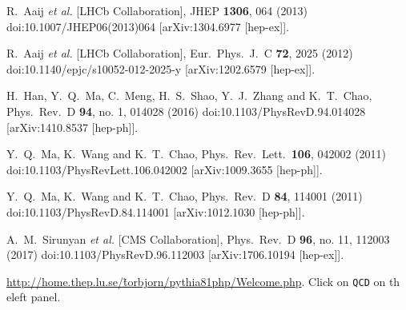 \documentclass[12pt]{article}
\begin{document}
\begin{thebibliography}{1}
  R.~Aaij {\it et al.} [LHCb Collaboration],
  JHEP {\bf 1306}, 064 (2013)
  doi:10.1007/JHEP06(2013)064
  [arXiv:1304.6977 [hep-ex]].

  R.~Aaij {\it et al.} [LHCb Collaboration],
  Eur.\ Phys.\ J.\ C {\bf 72}, 2025 (2012)
  doi:10.1140/epjc/s10052-012-2025-y
  [arXiv:1202.6579 [hep-ex]].

  H.~Han, Y.~Q.~Ma, C.~Meng, H.~S.~Shao, Y.~J.~Zhang and K.~T.~Chao,
  Phys.\ Rev.\ D {\bf 94}, no. 1, 014028 (2016)
  doi:10.1103/PhysRevD.94.014028
  [arXiv:1410.8537 [hep-ph]].

  Y.~Q.~Ma, K.~Wang and K.~T.~Chao,
  Phys.\ Rev.\ Lett.\  {\bf 106}, 042002 (2011)
  doi:10.1103/PhysRevLett.106.042002
  [arXiv:1009.3655 [hep-ph]].

  Y.~Q.~Ma, K.~Wang and K.~T.~Chao,
  Phys.\ Rev.\ D {\bf 84}, 114001 (2011)
  doi:10.1103/PhysRevD.84.114001
  [arXiv:1012.1030 [hep-ph]].

  A.~M.~Sirunyan {\it et al.} [CMS Collaboration],
  Phys.\ Rev.\ D {\bf 96}, no. 11, 112003 (2017)
  doi:10.1103/PhysRevD.96.112003
  [arXiv:1706.10194 [hep-ex]].

  
  
\href{http://home.thep.lu.se/\~torbjorn/pythia81php/Welcome.php}
{http://home.thep.lu.se/\~torbjorn/pythia81php/Welcome.php}.  Click on 
{\tt QCD} on th eleft panel.

\end{thebibliography}  
\end{document}
